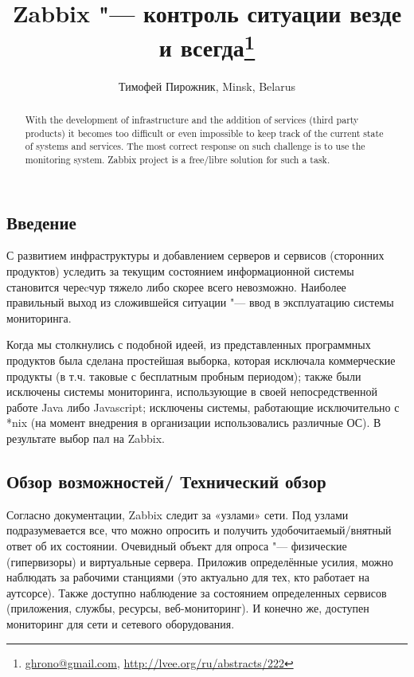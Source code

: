 \documentclass[10pt, a5paper]{article}
\begin{document}
\title{Zabbix "--- контроль ситуации везде и всегда\footnote{\url{ghrono@gmail.com}, \url{http://lvee.org/ru/abstracts/222}}}
\author{Тимофей Пирожник, Minsk, Belarus}
\maketitle
\begin{abstract}
With the development of infrastructure and the addition of services (third party products) it becomes too difficult or even impossible to keep track of the current state of systems and services. The most correct response on such challenge is to use the monitoring system. Zabbix project is a free/libre solution for such a task.
\end{abstract}
\subsection*{Введение}

С развитием инфраструктуры и добавлением серверов и сервисов (сторонних продуктов) уследить за текущим состоянием  информационной системы становится череcчур тяжело либо скорее всего невозможно. Наиболее правильный выход из сложившейся ситуации "--- ввод в эксплуатацию системы мониторинга.

Когда мы столкнулись с подобной идеей, из представленных программных продуктов была сделана простейшая выборка, которая исключала коммерческие продукты (в т.ч. таковые с бесплатным пробным периодом); также были исключены системы мониторинга, использующие в своей непосредственной работе Java либо Javascript; исключены системы, работающие исключительно с *nix (на момент внедрения в организации использовались различные ОС). В результате выбор пал на Zabbix.

\subsection*{Обзор возможностей/ Технический обзор}

Согласно документации, Zabbix следит за «узлами» сети. Под  узлами подразумевается все, что можно опросить и получить удобочитаемый/внятный ответ об их состоянии. Очевидный объект для опроса "--- физические (гипервизоры) и виртуальные сервера. Приложив определённые усилия, можно наблюдать за рабочими станциями (это актуально для тех, кто работает на аутсорсе). Также доступно наблюдение за состоянием определенных сервисов (приложения, службы, ресурсы,  веб-мониторинг). И конечно же, доступен мониторинг для сети и сетевого оборудования.
\end{document}
